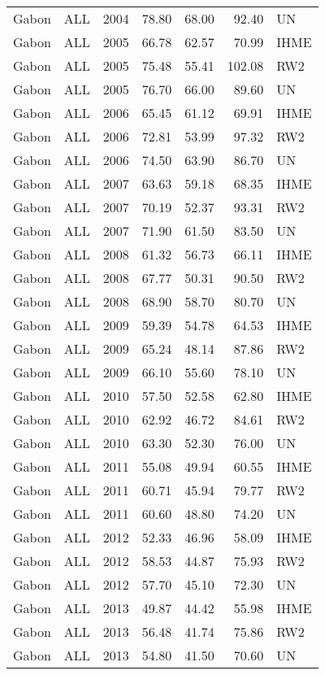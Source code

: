 \begin{longtable}{lllrrrl}
  Gabon & ALL & 2004 & 78.80 & 68.00 & 92.40 & UN \\ 
  Gabon & ALL & 2005 & 66.78 & 62.57 & 70.99 & IHME \\ 
  Gabon & ALL & 2005 & 75.48 & 55.41 & 102.08 & RW2 \\ 
  Gabon & ALL & 2005 & 76.70 & 66.00 & 89.60 & UN \\ 
  Gabon & ALL & 2006 & 65.45 & 61.12 & 69.91 & IHME \\ 
  Gabon & ALL & 2006 & 72.81 & 53.99 & 97.32 & RW2 \\ 
  Gabon & ALL & 2006 & 74.50 & 63.90 & 86.70 & UN \\ 
  Gabon & ALL & 2007 & 63.63 & 59.18 & 68.35 & IHME \\ 
  Gabon & ALL & 2007 & 70.19 & 52.37 & 93.31 & RW2 \\ 
  Gabon & ALL & 2007 & 71.90 & 61.50 & 83.50 & UN \\ 
  Gabon & ALL & 2008 & 61.32 & 56.73 & 66.11 & IHME \\ 
  Gabon & ALL & 2008 & 67.77 & 50.31 & 90.50 & RW2 \\ 
  Gabon & ALL & 2008 & 68.90 & 58.70 & 80.70 & UN \\ 
  Gabon & ALL & 2009 & 59.39 & 54.78 & 64.53 & IHME \\ 
  Gabon & ALL & 2009 & 65.24 & 48.14 & 87.86 & RW2 \\ 
  Gabon & ALL & 2009 & 66.10 & 55.60 & 78.10 & UN \\ 
  Gabon & ALL & 2010 & 57.50 & 52.58 & 62.80 & IHME \\ 
  Gabon & ALL & 2010 & 62.92 & 46.72 & 84.61 & RW2 \\ 
  Gabon & ALL & 2010 & 63.30 & 52.30 & 76.00 & UN \\ 
  Gabon & ALL & 2011 & 55.08 & 49.94 & 60.55 & IHME \\ 
  Gabon & ALL & 2011 & 60.71 & 45.94 & 79.77 & RW2 \\ 
  Gabon & ALL & 2011 & 60.60 & 48.80 & 74.20 & UN \\ 
  Gabon & ALL & 2012 & 52.33 & 46.96 & 58.09 & IHME \\ 
  Gabon & ALL & 2012 & 58.53 & 44.87 & 75.93 & RW2 \\ 
  Gabon & ALL & 2012 & 57.70 & 45.10 & 72.30 & UN \\ 
  Gabon & ALL & 2013 & 49.87 & 44.42 & 55.98 & IHME \\ 
  Gabon & ALL & 2013 & 56.48 & 41.74 & 75.86 & RW2 \\ 
  Gabon & ALL & 2013 & 54.80 & 41.50 & 70.60 & UN \\ 

\end{longtable}

